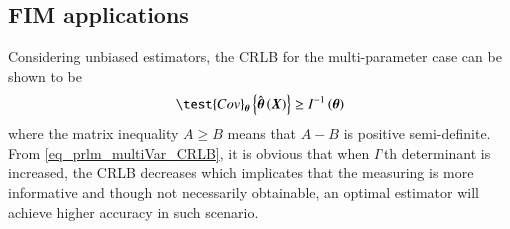 \subsection{FIM applications}
Considering unbiased estimators, the CRLB for the multi-parameter case can be shown to be
\begin{equation}
\label{eq_prlm_multiVar_CRLB}
    \test{Cov}_{\vecnot{\theta}}\cBrace{\hat{\vecnot{\theta}}\rBrace{\vecnot{X}}}\geq{}I^{-1}\rBrace{\vecnot{\theta}}
\end{equation}
where the matrix inequality $A\geq{}B$ means that $A-B$ is positive semi-definite.
From \eqref{eq_prlm_multiVar_CRLB}, it is obvious that when $I$'th determinant is increased, the CRLB decreases which implicates that the measuring is more informative and though not necessarily obtainable, an optimal estimator will achieve higher accuracy in such scenario.